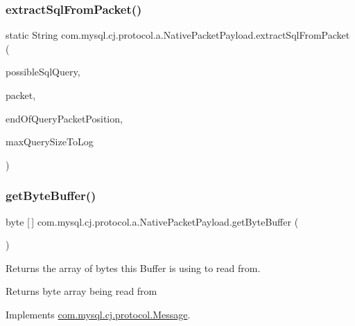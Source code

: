 \subsubsection{\texorpdfstring{extract\+Sql\+From\+Packet()}{extractSqlFromPacket()}}
{\footnotesize\ttfamily static String com.\+mysql.\+cj.\+protocol.\+a.\+Native\+Packet\+Payload.\+extract\+Sql\+From\+Packet (\begin{DoxyParamCaption}\item[{String}]{possible\+Sql\+Query,  }\item[{\mbox{\hyperlink{classcom_1_1mysql_1_1cj_1_1protocol_1_1a_1_1_native_packet_payload}{Native\+Packet\+Payload}}}]{packet,  }\item[{int}]{end\+Of\+Query\+Packet\+Position,  }\item[{int}]{max\+Query\+Size\+To\+Log }\end{DoxyParamCaption})\hspace{0.3cm}{\ttfamily [static]}}

\mbox{\label{classcom_1_1mysql_1_1cj_1_1protocol_1_1a_1_1_native_packet_payload_a9aad2cb05c0a41d027987a601991e1a0}} 
\subsubsection{\texorpdfstring{get\+Byte\+Buffer()}{getByteBuffer()}}
{\footnotesize\ttfamily byte \mbox{[}$\,$\mbox{]} com.\+mysql.\+cj.\+protocol.\+a.\+Native\+Packet\+Payload.\+get\+Byte\+Buffer (\begin{DoxyParamCaption}{ }\end{DoxyParamCaption})}

Returns the array of bytes this Buffer is using to read from.

\begin{DoxyReturn}{Returns}
byte array being read from 
\end{DoxyReturn}


Implements \mbox{\hyperlink{interfacecom_1_1mysql_1_1cj_1_1protocol_1_1_message_a853af9bf4f09a55058141c7b041a8815}{com.\+mysql.\+cj.\+protocol.\+Message}}.

